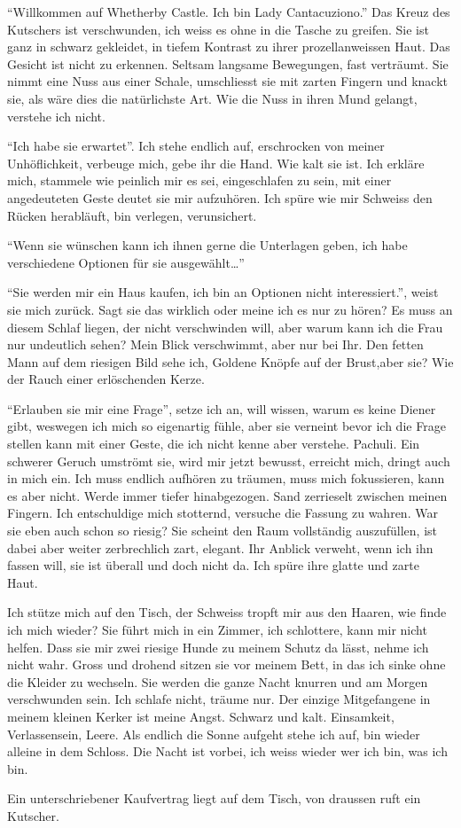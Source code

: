 \enquote{Willkommen auf Whetherby Castle. Ich bin Lady Cantacuziono.} Das Kreuz des Kutschers ist verschwunden, ich weiss es ohne in die Tasche zu greifen. Sie ist ganz in schwarz gekleidet, in tiefem Kontrast zu ihrer prozellanweissen Haut. Das Gesicht ist nicht zu erkennen. Seltsam langsame Bewegungen, fast verträumt. Sie nimmt eine Nuss aus einer Schale, umschliesst sie mit zarten Fingern und knackt sie, als wäre dies die natürlichste Art. Wie die Nuss in ihren Mund gelangt, verstehe ich nicht.

\enquote{Ich habe sie erwartet}. Ich stehe endlich auf, erschrocken von meiner Unhöflichkeit, verbeuge mich, gebe ihr die Hand. Wie kalt sie ist. Ich erkläre mich, stammele wie peinlich mir es sei, eingeschlafen zu sein, mit einer angedeuteten Geste deutet sie mir aufzuhören. Ich spüre wie mir Schweiss den Rücken herabläuft, bin verlegen, verunsichert.

\enquote{Wenn sie wünschen kann ich ihnen gerne die Unterlagen geben, ich habe verschiedene Optionen für sie ausgewählt\dots} 

\enquote{Sie werden mir ein Haus kaufen, ich bin an Optionen nicht interessiert.}, weist sie mich zurück. Sagt sie das wirklich oder meine ich es nur zu hören? Es muss an diesem Schlaf liegen, der nicht verschwinden will, aber warum kann ich die Frau nur undeutlich sehen? Mein Blick verschwimmt, aber nur bei Ihr. Den fetten Mann auf dem riesigen Bild sehe ich, Goldene Knöpfe auf der Brust,aber sie? Wie der Rauch einer erlöschenden Kerze.

\enquote{Erlauben sie mir eine Frage}, setze ich an, will wissen, warum es keine Diener gibt, weswegen ich mich so eigenartig fühle, aber sie verneint bevor ich die Frage stellen kann mit einer Geste, die ich nicht kenne aber verstehe. Pachuli. Ein schwerer Geruch umströmt sie, wird mir jetzt bewusst, erreicht mich, dringt auch in mich ein. Ich muss endlich aufhören zu träumen, muss mich fokussieren, kann es aber nicht. Werde immer tiefer hinabgezogen. Sand zerrieselt zwischen meinen Fingern. Ich entschuldige mich stotternd, versuche die Fassung zu wahren. War sie eben auch schon so riesig? Sie scheint den Raum vollständig auszufüllen, ist dabei aber weiter zerbrechlich zart, elegant. Ihr Anblick verweht, wenn ich ihn fassen will, sie ist überall und doch nicht da. Ich spüre ihre glatte und zarte Haut.

Ich stütze mich auf den Tisch, der Schweiss tropft mir aus den Haaren, wie finde ich mich wieder? Sie führt mich in ein Zimmer, ich schlottere, kann mir nicht helfen. Dass sie mir zwei riesige Hunde zu meinem Schutz da lässt, nehme ich nicht wahr. Gross und drohend sitzen sie vor meinem Bett, in das ich sinke ohne die Kleider zu wechseln. Sie werden die ganze Nacht knurren und am Morgen verschwunden sein. Ich schlafe nicht, träume nur. Der einzige Mitgefangene in meinem kleinen Kerker ist meine Angst. Schwarz und kalt. Einsamkeit, Verlassensein, Leere. Als endlich die Sonne aufgeht stehe ich auf, bin wieder alleine in dem Schloss. Die Nacht ist vorbei, ich weiss wieder wer ich bin, was ich bin. 

Ein unterschriebener Kaufvertrag liegt auf dem Tisch, von draussen ruft ein Kutscher.\hfill {}
\newpage 
